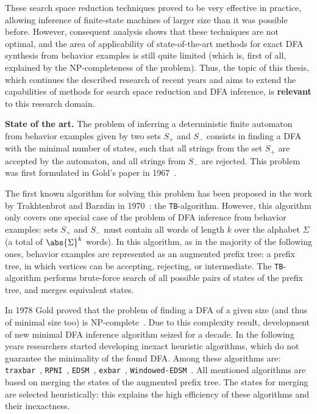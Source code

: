 These search space reduction techniques proved to be very effective in practice, allowing inference of finite-state machines of larger size than it was possible before.
However, consequent analysis shows that these techniques are not optimal, and the area of applicability of state-of-the-art methods for exact DFA synthesis from behavior examples is still quite limited
(which is, first of all, explained by the NP-completeness of the problem).
Thus, the topic of this thesis, which continues the described research of recent years and aims to extend the capabilities of methods for search space reduction and DFA inference, 
is \textbf{relevant} to this research domain.

\textbf{State of the art.}
The problem of inferring a deterministic finite automaton from behavior examples given by two sets $S_{+}$ and $S_{-}$ consists in finding a DFA with the minimal number of states,
such that all strings from the set $S_{+}$ are accepted by the automaton, and all strings from $S_{-}$ are rejected.
This problem was first formulated in Gold's paper in 1967~\cite{DBLP:journals/iandc/Gold67}.

The first known algorithm for solving this problem has been proposed in the work by Trakhtenbrot and Barzdin in 1970~\cite{trakhtenbrot-1973-modeling-en}: the \texttt{TB}-algorithm.
However, this algorithm only covers one special case of the problem of DFA inference from behavior examples:
sets $S_{+}$ and $S_{-}$ must contain all words of length $k$ over the alphabet $\Sigma$ (a total of $\abs{\Sigma}^{k}$ words).
In this algorithm, as in the majority of the following ones, behavior examples are represented as an augmented prefix tree: a prefix tree, in which vertices can be accepting, rejecting, or intermediate.
The \texttt{TB}-algorithm performs brute-force search of all possible pairs of states of the prefix tree, and merges equivalent states.

In 1978 Gold proved that the problem of finding a DFA of a given size (and thus of minimal size too) is NP-complete~\cite{DBLP:journals/iandc/Gold78}.
Due to this complexity result, development of new minimal DFA inference algorithm seized for a decade.
In the following years researchers started developing inexact heuristic algorithms, which do not guarantee the minimality of the found DFA.
Among these algorithms are: \texttt{traxbar}~\cite{DBLP:conf/colt/Lang92}, \texttt{RPNI}~\cite{oncina-rpni-1992}, \texttt{EDSM}~\cite{DBLP:conf/icgi/LangPP98}, \texttt{exbar}~\cite{lang-1999-faster}, \texttt{Windowed-EDSM}~\cite{DBLP:conf/icgi/CicchelloK02}.
All mentioned algorithms are based on merging the states of the augmented prefix tree.
The states for merging are selected heuristically: this explains the high efficiency of these algorithms and their inexactness.

